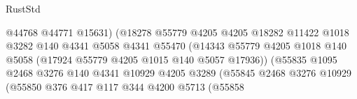 \begin{lexlean}{RustStd}
\begin{coremodule}
                                                  @44768
                                                  @44771
                                                  @15631)
                                                (@18278
                                                  @55779
                                                  @4205
                                                  @4205
                                                  @18282
                                                  @11422
                                                  @1018
                                                  @3282
                                                  @140
                                                  @4341
                                                  @5058
                                                  @4341
                                                  @55470
                                                  (@14343
                                                    @55779
                                                    @4205
                                                    @1018
                                                    @140
                                                    @5058
                                                    (@17924 @55779 @4205 @1015 @140 @5057 @17936))
                                                  (@55835
                                                    @1095
                                                    @2468
                                                    @3276
                                                    @140
                                                    @4341
                                                    @10929
                                                    @4205
                                                    @3289
                                                    (@55845
                                                      @2468
                                                      @3276
                                                      @10929
                                                      (@55850
                                                        @376
                                                        @417
                                                        @117
                                                        @344
                                                        @4200
                                                        @5713
                                                        (@55858

\end{coremodule}
\end{lexlean}
